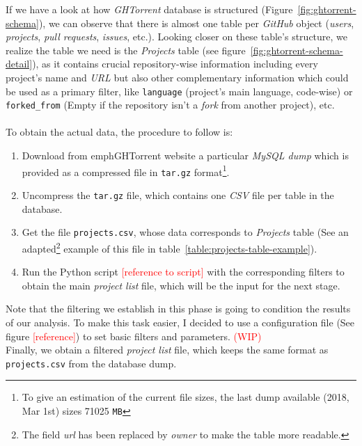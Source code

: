 \documentclass[a4paper, 12pt]{book}
\begin{document}
If we have a look at how \emph{GHTorrent} database is structured (Figure~\ref{fig:ghtorrent-schema}), we can observe that
there is almost one table per \emph{GitHub} object (\textit{users}, \textit{projects}, \textit{pull requests}, \textit{issues}, etc.).
Looking closer on these table's structure, we realize the table we need is the \emph{Projects} table
(see figure~\ref{fig:ghtorrent-schema-detail}), as it contains crucial repository-wise information including every project's name
and \textit{URL} but also other complementary information which could be used as a primary filter, like \texttt{language} (project's main language,
code-wise) or \texttt{forked\_from} (Empty if the repository isn't a \textit{fork} from another project), etc.\\\\
To obtain the actual data, the procedure to follow is:
\begin{enumerate}
  \item Download from emph{GHTorrent} website a particular \emph{MySQL dump} which is provided as a compressed file in \texttt{tar.gz}
        format\footnote{To give an estimation of the current file sizes, the last dump available (2018, Mar 1st) sizes 71025 \texttt{MB}}.
  \item Uncompress the \texttt{tar.gz} file, which contains one \emph{CSV} file per table in the database.
  \item Get the file \texttt{projects.csv}, whose data corresponds to \emph{Projects} table (See an adapted\footnote{The field \emph{url} has been replaced by \emph{owner} to make the table more readable.}
  example of this file in table~\ref{table:projects-table-example}).
  \item Run the Python script \textcolor{red}{[reference to script]} with the corresponding filters to obtain the main
        \emph{project list} file, which will be the input for the next stage.
\end{enumerate}
Note that the filtering we establish in this phase is going to condition the results of our analysis. To make this task easier,
I decided to use a configuration file (See figure \textcolor{red}{[reference]}) to set basic filters and parameters. \textcolor{red}{(WIP)}\\
Finally, we obtain a filtered \emph{project list} file, which keeps the same format as \texttt{projects.csv} from the database dump.
\end{document}

